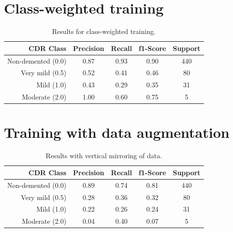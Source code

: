 \documentclass{kththesis}
\begin{document}
\section{Class-weighted training}
\begin{table}[H]
  \begin{center}
    \caption{Results for class-weighted training. \label{tab:results_class_weighted}}
    \begin{tabular}{r|ccc|c}
      \textbf{CDR Class} & \textbf{Precision} & \textbf{Recall} & \textbf{f1-Score} & \textbf{Support} \\
      \toprule
      Non-demented (0.0) & 0.87 & 0.93 & 0.90 & 440 \\
      Very mild (0.5)    & 0.52 & 0.41 & 0.46 & 80  \\
      Mild (1.0)         & 0.43 & 0.29 & 0.35 & 31  \\
      Moderate (2.0)     & 1.00 & 0.60 & 0.75 & 5   \\
    \end{tabular}
  \end{center}
\end{table}

\section{Training with data augmentation}


\begin{table}[H]
  \begin{center}
    \caption{Results with vertical mirroring of data. \label{tab:results_vertical augmentation}}
    \begin{tabular}{r|ccc|c}
      \textbf{CDR Class} & \textbf{Precision} & \textbf{Recall} & \textbf{f1-Score} & \textbf{Support} \\
      \toprule
           Non-demented (0.0) &  0.89   &  0.74   &  0.81    &  440 \\
           Very mild (0.5)    &  0.28   &  0.36   &  0.32    &   80 \\
           Mild (1.0)         &  0.22   &  0.26   &  0.24    &   31 \\
           Moderate (2.0)     &  0.04   &  0.40   &  0.07    &    5 \\
    \end{tabular}
  \end{center}
\end{table}
\end{document}
